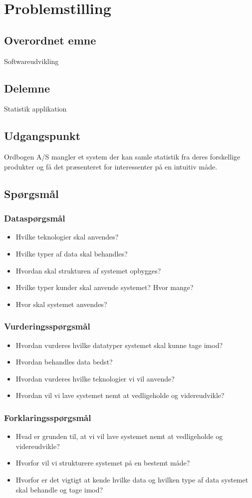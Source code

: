 \section{Problemstilling}
\subsection{Overordnet emne}
Softwareudvikling
\subsection{Delemne}
Statistik applikation
\subsection{Udgangspunkt}
Ordbogen A/S mangler et system der kan samle statistik fra deres forskellige produkter og få det præsenteret for interessenter på en intuitiv måde.
\subsection{Spørgsmål}
\subsubsection{Dataspørgsmål}
\begin{itemize}
    \item{Hvilke teknologier skal anvendes?}
    \item{Hvilke typer af data skal behandles?}
    \item{Hvordan skal strukturen af systemet opbygges?}
    \item{Hvilke typer kunder skal anvende systemet? Hvor mange?}
    \item{Hvor skal systemet anvendes?}
\end{itemize}
\subsubsection{Vurderingsspørgsmål}
\begin{itemize}
    \item{Hvordan vurderes hvilke datatyper systemet skal kunne tage imod?}
    \item{Hvordan behandles data bedst?}
    \item{Hvordan vurderes hvilke teknologier vi vil anvende?}
    \item{Hvordan vil vi lave systemet nemt at vedligeholde og videreudvikle?}
\end{itemize}
\subsubsection{Forklaringsspørgsmål}
\begin{itemize}
    \item{Hvad er grunden til, at vi vil lave systemet nemt at vedligeholde og videreudvikle?}
    \item{Hvorfor vil vi strukturere systemet på en bestemt måde?}
    \item{Hvorfor er det vigtigt at kende hvilke data og hvilken type af data systemet skal behandle og tage imod?}
\end{itemize}
